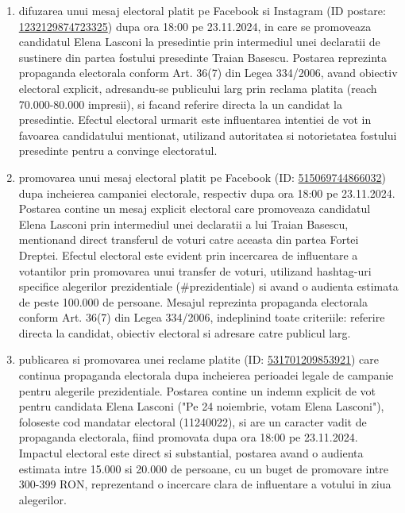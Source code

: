 \documentclass[a4paper,12pt]{article}
\begin{document}
\begin{enumerate}[leftmargin=*, label=\arabic*.)]
    \item difuzarea unui mesaj electoral platit pe Facebook si Instagram (ID postare: \href{https://www.facebook.com/ads/library/?id=1232129874723325}{1232129874723325}) dupa ora 18:00 pe 23.11.2024, in care se promoveaza candidatul Elena Lasconi la presedintie prin intermediul unei declaratii de sustinere din partea fostului presedinte Traian Basescu. Postarea reprezinta propaganda electorala conform Art. 36(7) din Legea 334/2006, avand obiectiv electoral explicit, adresandu-se publicului larg prin reclama platita (reach 70.000-80.000 impresii), si facand referire directa la un candidat la presedintie. Efectul electoral urmarit este influentarea intentiei de vot in favoarea candidatului mentionat, utilizand autoritatea si notorietatea fostului presedinte pentru a convinge electoratul.
    \item promovarea unui mesaj electoral platit pe Facebook (ID: \href{https://www.facebook.com/ads/library/?id=515069744866032}{515069744866032}) dupa incheierea campaniei electorale, respectiv dupa ora 18:00 pe 23.11.2024. Postarea contine un mesaj explicit electoral care promoveaza candidatul Elena Lasconi prin intermediul unei declaratii a lui Traian Basescu, mentionand direct transferul de voturi catre aceasta din partea Fortei Dreptei. Efectul electoral este evident prin incercarea de influentare a votantilor prin promovarea unui transfer de voturi, utilizand hashtag-uri specifice alegerilor prezidentiale (\#prezidentiale) si avand o audienta estimata de peste 100.000 de persoane. Mesajul reprezinta propaganda electorala conform Art. 36(7) din Legea 334/2006, indeplinind toate criteriile: referire directa la candidat, obiectiv electoral si adresare catre publicul larg.
    \item publicarea si promovarea unei reclame platite (ID: \href{https://www.facebook.com/ads/library/?id=531701209853921}{531701209853921}) care continua propaganda electorala dupa incheierea perioadei legale de campanie pentru alegerile prezidentiale. Postarea contine un indemn explicit de vot pentru candidata Elena Lasconi ("Pe 24 noiembrie, votam Elena Lasconi"), foloseste cod mandatar electoral (11240022), si are un caracter vadit de propaganda electorala, fiind promovata dupa ora 18:00 pe 23.11.2024. Impactul electoral este direct si substantial, postarea avand o audienta estimata intre 15.000 si 20.000 de persoane, cu un buget de promovare intre 300-399 RON, reprezentand o incercare clara de influentare a votului in ziua alegerilor.

\end{enumerate}
\end{document}
